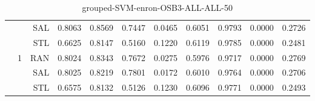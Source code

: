 \begin{center}
\begin{table}[htbp]
\begin{center}
\begin{tabular}{ | r | r | r | r | r | r | r | r | r | r | r |}
 &   & SAL & 0.8063 & 0.8569 & 0.7447 & 0.0465 & 0.6051 & 0.9793 & 0.0000 & 0.2726\\ \cline{3-11}
 &   & STL & 0.6625 & 0.8147 & 0.5160 & 0.1220 & 0.6119 & 0.9785 & 0.0000 & 0.2481\\ \cline{2-11}
 & \multirow{3}{*}{1} & RAN & 0.8024 & 0.8343 & 0.7672 & 0.0275 & 0.5976 & 0.9717 & 0.0000 & 0.2769\\ \cline{3-11}
 &   & SAL & 0.8025 & 0.8219 & 0.7801 & 0.0172 & 0.6010 & 0.9764 & 0.0000 & 0.2706\\ \cline{3-11}
 &   & STL & 0.6575 & 0.8132 & 0.5126 & 0.1230 & 0.6096 & 0.9771 & 0.0000 & 0.2493\\ \cline{2-11}
\hline
\end{tabular}
\caption{grouped-SVM-enron-OSB3-ALL-ALL-50}
\end{center}
 \end{table}
\end{center}

